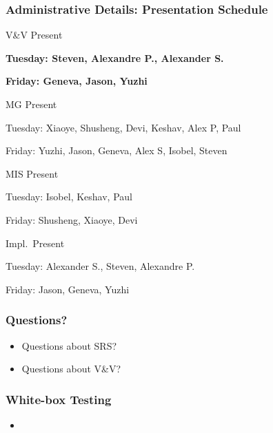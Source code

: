 \documentclass[t,12pt,numbers,fleqn]{beamer}
\begin{document}
\begin{frame}
\frametitle{Administrative Details: Presentation Schedule}

\bi
\item V\&V Present
\bi
\item \textbf{Tuesday: Steven, Alexandre P., Alexander S.}
\item \textbf{Friday: Geneva, Jason, Yuzhi}
\ei
\item MG Present
\bi
\item Tuesday: Xiaoye, Shusheng, Devi, Keshav, Alex P, Paul
\item Friday: Yuzhi, Jason, Geneva, Alex S, Isobel, Steven
\ei
\item MIS Present
\bi
\item Tuesday: Isobel, Keshav, Paul
\item Friday: Shusheng, Xiaoye, Devi
\ei
\item Impl.\ Present
\bi
\item Tuesday: Alexander S., Steven, Alexandre P.
\item Friday: Jason, Geneva, Yuzhi
\ei
\ei

\end{frame}


\begin{frame}
\frametitle{Questions?}
\begin{itemize}
\item Questions about SRS?
\item Questions about V\&V?
\end{itemize}
\end{frame}


\begin{frame}
\frametitle{White-box Testing}

\begin{itemize}
\item {}
\end{itemize}

\end{frame}

\end{document}
